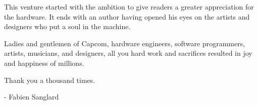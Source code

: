 This venture started with the ambition to give readers a greater appreciation for the hardware. It ends with an author having opened his eyes on the artists and designers who put a soul in the machine.

Ladies and gentlemen of Capcom, hardware engineers, software programmers, artists, musicians, and designers, all you hard work and sacrifices resulted in joy and happiness of millions. 

Thank you a thousand times. 

- Fabien Sanglard

